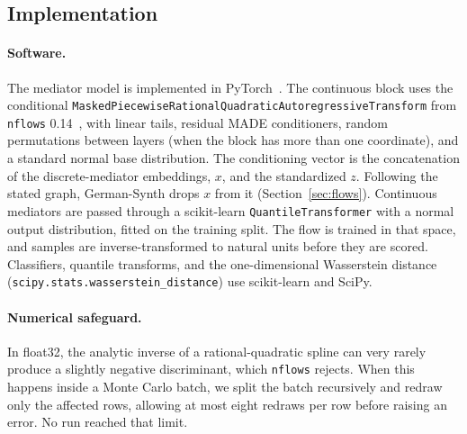 \subsection{Implementation}
\label{app:implementation}

\paragraph{Software.}
The mediator model is implemented in PyTorch~\citep{paszke2019pytorch}. The
continuous block uses the conditional
\texttt{MaskedPiecewiseRationalQuadraticAutoregressiveTransform} from
\texttt{nflows} 0.14~\citep{nflows}, with linear tails, residual MADE
conditioners, random permutations between layers (when the block has more
than one coordinate), and a standard normal base distribution. The
conditioning vector is the concatenation of the discrete-mediator embeddings,
$x$, and the standardized $z$. Following the stated graph, German-Synth drops
$x$ from it (Section~\ref{sec:flows}). Continuous mediators are passed through
a scikit-learn \texttt{QuantileTransformer} with a normal output distribution,
fitted on the training split. The flow is trained in that space, and samples
are inverse-transformed to natural units before they are scored. Classifiers,
quantile transforms, and the one-dimensional Wasserstein distance
(\texttt{scipy.stats.wasserstein\_distance}) use scikit-learn and SciPy.

\paragraph{Numerical safeguard.}
In float32, the analytic inverse of a rational-quadratic spline can very
rarely produce a slightly negative discriminant, which \texttt{nflows}
rejects. When this happens inside a Monte Carlo batch, we split the batch
recursively and redraw only the affected rows, allowing at most eight redraws
per row before raising an error. No run reached that limit.

